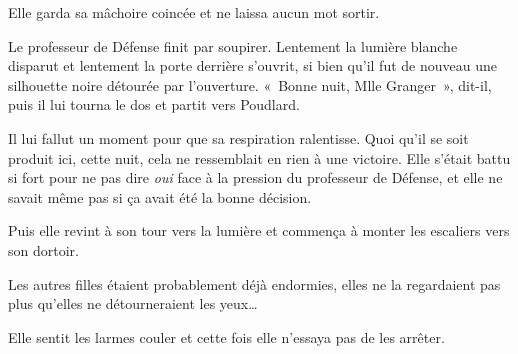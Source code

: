 Elle garda sa mâchoire coincée et ne laissa aucun mot sortir.

Le professeur de Défense finit par soupirer.
Lentement la lumière blanche disparut et lentement la porte derrière s'ouvrit, si bien qu'il fut de nouveau une silhouette noire détourée par l'ouverture.
«~Bonne nuit, Mlle Granger~», dit-il, puis il lui tourna le dos et partit vers Poudlard.

Il lui fallut un moment pour que sa respiration ralentisse.
Quoi qu'il se soit produit ici, cette nuit, cela ne ressemblait en rien à une victoire.
Elle s'était battu si fort pour ne pas dire \emph{oui} face à la pression du professeur de Défense, et elle ne savait même pas si ça avait été la bonne décision.

Puis elle revint à son tour vers la lumière et commença à monter les escaliers vers son dortoir.

Les autres filles étaient probablement déjà endormies, elles ne la regardaient pas plus qu'elles ne détourneraient les yeux…

Elle sentit les larmes couler et cette fois elle n'essaya pas de les arrêter.
